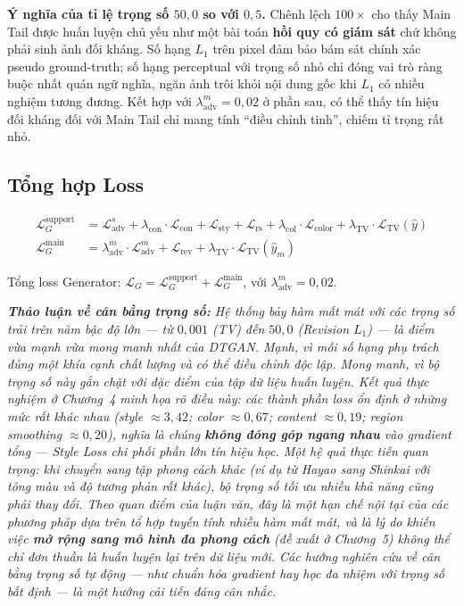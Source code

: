 \textbf{Ý nghĩa của tỉ lệ trọng số $50{,}0$ so với $0{,}5$.} Chênh lệch $100\times$ cho thấy Main Tail được huấn luyện chủ yếu như một bài toán \textbf{hồi quy có giám sát} chứ không phải sinh ảnh đối kháng. Số hạng $L_1$ trên pixel đảm bảo bám sát chính xác pseudo ground-truth; số hạng perceptual với trọng số nhỏ chỉ đóng vai trò ràng buộc nhất quán ngữ nghĩa, ngăn ảnh trôi khỏi nội dung gốc khi $L_1$ có nhiều nghiệm tương đương. Kết hợp với $\lambda_{\text{adv}}^m = 0{,}02$ ở phần sau, có thể thấy tín hiệu đối kháng đối với Main Tail chỉ mang tính ``điều chỉnh tinh'', chiếm tỉ trọng rất nhỏ.

\subsection{Tổng hợp Loss}
\label{subsec:total_loss}

\begin{align}
\label{eq:total_support_loss}
\mathcal{L}_G^{\text{support}} &= \mathcal{L}_{\text{adv}}^s + \lambda_{\text{con}} \cdot \mathcal{L}_{\text{con}} + \mathcal{L}_{\text{sty}} + \mathcal{L}_{\text{rs}} + \lambda_{\text{col}} \cdot \mathcal{L}_{\text{color}} + \lambda_{\text{TV}} \cdot \mathcal{L}_{\text{TV}}(\widehat{y}) \\
\label{eq:total_main_loss}
\mathcal{L}_G^{\text{main}} &= \lambda_{\text{adv}}^m \cdot \mathcal{L}_{\text{adv}}^m + \mathcal{L}_{\text{rev}} + \lambda_{\text{TV}} \cdot \mathcal{L}_{\text{TV}}(\widehat{y}_m)
\end{align}

Tổng loss Generator: $\mathcal{L}_G = \mathcal{L}_G^{\text{support}} + \mathcal{L}_G^{\text{main}}$, với $\lambda_{\text{adv}}^m = 0{,}02$.

\medskip
\noindent\textit{\textbf{Thảo luận về cân bằng trọng số:} Hệ thống bảy hàm mất mát với các trọng số trải trên năm bậc độ lớn --- từ $0{,}001$ (TV) đến $50{,}0$ (Revision $L_1$) --- là điểm vừa mạnh vừa mong manh nhất của DTGAN. Mạnh, vì mỗi số hạng phụ trách đúng một khía cạnh chất lượng và có thể điều chỉnh độc lập. Mong manh, vì bộ trọng số này gắn chặt với đặc điểm của tập dữ liệu huấn luyện. Kết quả thực nghiệm ở Chương~4 minh họa rõ điều này: các thành phần loss ổn định ở những mức rất khác nhau (style $\approx 3{,}42$; color $\approx 0{,}67$; content $\approx 0{,}19$; region smoothing $\approx 0{,}20$), nghĩa là chúng \textbf{không đóng góp ngang nhau} vào gradient tổng --- Style Loss chi phối phần lớn tín hiệu học. Một hệ quả thực tiễn quan trọng: khi chuyển sang tập phong cách khác (ví dụ từ Hayao sang Shinkai với tông màu và độ tương phản rất khác), bộ trọng số tối ưu nhiều khả năng cũng phải thay đổi. Theo quan điểm của luận văn, đây là một hạn chế nội tại của các phương pháp dựa trên tổ hợp tuyến tính nhiều hàm mất mát, và là lý do khiến việc \textbf{mở rộng sang mô hình đa phong cách} (đề xuất ở Chương~5) không thể chỉ đơn thuần là huấn luyện lại trên dữ liệu mới. Các hướng nghiên cứu về cân bằng trọng số tự động --- như chuẩn hóa gradient hay học đa nhiệm với trọng số bất định --- là một hướng cải tiến đáng cân nhắc.}

